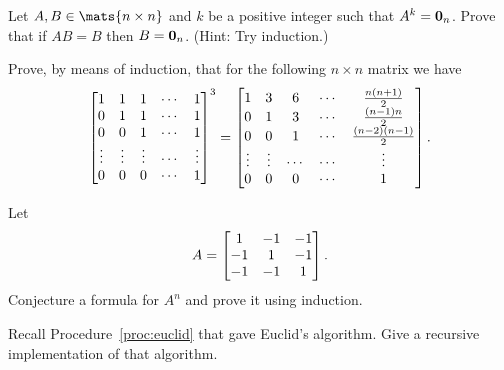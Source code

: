 \begin{pro}
Let $A,B\in\mats{n\times n}$ and $k$ be a positive
integer such that $A^k = {\bf 0}_n$. 
Prove that if $AB = B$ then $B ={\bf 0}_n$.
(Hint: Try induction.)
\end{pro}

\begin{pro}
Prove, by means of induction, that for the following $n\times n$
matrix we have
$$\begin{bmatrix} 1 & 1 & 1 & \cdots & 1 \cr 0 & 1 & 1 & \cdots & 1 \cr
0 & 0 & 1 & \cdots & 1 \cr \vdots & \vdots & \vdots & \cdots &
\vdots \cr 0 & 0 & 0 & \cdots & 1 \cr
\end{bmatrix}^3 = \begin{bmatrix}
1 & 3 & 6 & \cdots & \frac{n(n+1)}{2} \cr 0 & 1 & 3 & \cdots &
\frac{(n-1)n}{2} \cr 0 & 0 & 1 & \cdots & \frac{(n-2)(n-1)}{2} \cr
\vdots & \vdots & \cdots & \cdots & \vdots \cr 0 & 0 & 0 & \cdots &
1 \cr\end{bmatrix}.
$$
\end{pro}


\begin{pro}
Let $$A = \begin{bmatrix} 1 & -1 & -1 \cr -1 & 1 & -1 \cr -1 & -1 &
1 \cr\end{bmatrix}.$$
Conjecture a formula for $A^n$ and prove it
using induction.
\end{pro}

\begin{pro}
Recall Procedure~\ref{proc:euclid} that gave Euclid's algorithm.
Give a recursive implementation of that algorithm. 
\end{pro}
